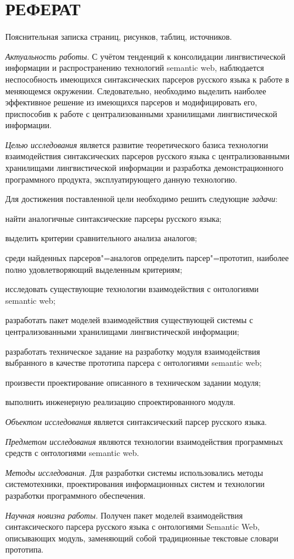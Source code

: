 \section*{\centering РЕФЕРАТ}

Пояснительная записка  страниц,  рисунков, 
таблиц,  источников.

\emph{Актуальность работы}. С учётом тенденций к консолидации лингвистической 
информации и распространению технологий semantic web, наблюдается неспособность
имеющихся синтаксических парсеров русского языка к работе в меняющемся окружении. 
Следовательно, необходимо выделить наиболее эффективное решение из имеющихся
парсеров и модифицировать его, приспособив к работе с централизованными
хранилищами лингвистической информации.

\emph{Целью исследования} является развитие теоретического базиса технологии
взаимодействия синтаксических парсеров русского языка с централизованными
хранилищами лингвистической информации и разработка демонстрационного программного
продукта, эксплуатирующего данную технологию.

Для достижения поставленной цели необходимо решить следующие \emph{задачи}:
\begin{list}{}{\leftmargin=1.5cm}
  \item найти аналогичные синтаксические парсеры русского языка;
  \item выделить критерии сравнительного анализа аналогов;
  \item среди найденных парсеров"=аналогов определить парсер"=прототип,
  наиболее полно удовлетворяющий выделенным критериям;
  \item исследовать существующие технологии взаимодействия с онтологиями \\
  semantic  web;
  \item разработать пакет моделей взаимодействия существующей системы с
  централизованными хранилищами лингвистической информации;
  \item разработать техническое задание на разработку модуля взаимодействия выбранного
  в качестве прототипа парсера с онтологиями semantic web;
  \item произвести проектирование описанного в техническом задании модуля;
  \item выполнить инженерную реализацию спроектированного модуля.
\end{list}

\emph{Объектом исследования} является синтаксический парсер русского языка.

\emph{Предметом исследования} являются технологии взаимодействия программных
средств с онтологиями semantic web.

\emph{Методы исследования}. Для разработки системы использовались методы
системотехники, проектирования информационных систем и технологии разработки
программного обеспечения.

\emph{Научная новизна работы}. Получен пакет моделей взаимодействия синтаксического
парсера русского языка с онтологиями Semantic Web, описывающих модуль, заменяющий собой традиционные текстовые словари прототипа.
